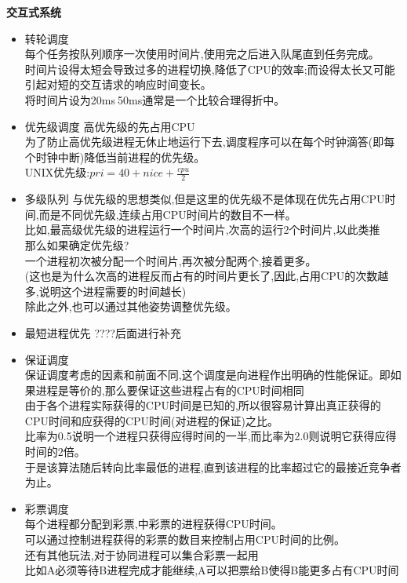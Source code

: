 \documentclass[UTF8,a4paper]{ctexart}
\newcommand{\spaceline}{\vspace{\baselineskip}}
\begin{document}
    \spaceline
    \textbf{交互式系统}
    \begin{itemize}
      \item 转轮调度\\
      每个任务按队列顺序一次使用时间片,使用完之后进入队尾直到任务完成。\\
      时间片设得太短会导致过多的进程切换,降低了CPU的效率;而设得太长又可能引起对短的交互请求的响应时间变长。\\
      将时间片设为20ms$~$50ms通常是一个比较合理得折中。

      \item 优先级调度
      高优先级的先占用CPU\\
      为了防止高优先级进程无休止地运行下去,调度程序可以在每个时钟滴答(即每个时钟中断)降低当前进程的优先级。\\
      UNIX优先级:$pri = 40 + nice + \frac{cpu}{2}$

      \item 多级队列
      与优先级的思想类似,但是这里的优先级不是体现在优先占用CPU时间,而是不同优先级,连续占用CPU时间片的数目不一样。\\
      比如,最高级优先级的进程运行一个时间片,次高的运行2个时间片,以此类推\\
      那么如果确定优先级?\\
      一个进程初次被分配一个时间片,再次被分配两个,接着更多。\\
      (这也是为什么次高的进程反而占有的时间片更长了,因此,占用CPU的次数越多,说明这个进程需要的时间越长)\\
      除此之外,也可以通过其他姿势调整优先级。

      \item 最短进程优先{\color{red} ????后面进行补充}

      \item 保证调度\\
      保证调度考虑的因素和前面不同,这个调度是向进程作出明确的性能保证。即如果进程是等价的,那么要保证这些进程占有的CPU时间相同\\
      由于各个进程实际获得的CPU时间是已知的,所以很容易计算出真正获得的CPU时间和应获得的CPU时间(对进程的保证)之比。\\
      比率为0.5说明一个进程只获得应得时间的一半,而比率为2.0则说明它获得应得时间的2倍。\\
      于是该算法随后转向比率最低的进程,直到该进程的比率超过它的最接近竞争者为止。

      \item 彩票调度\\
      每个进程都分配到彩票,中彩票的进程获得CPU时间。\\
      可以通过控制进程获得的彩票的数目来控制占用CPU时间的比例。\\
      还有其他玩法,对于协同进程可以集合彩票一起用\\
      比如A必须等待B进程完成才能继续,A可以把票给B使得B能更多占有CPU时间


\end{itemize}
\end{document}
